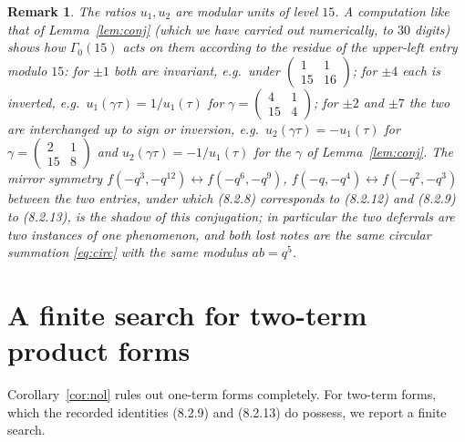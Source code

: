 \documentclass[pdflatex,sn-mathphys-num]{sn-jnl}
\theoremstyle{thmstyleone}%
\theoremstyle{thmstyletwo}%
\newtheorem{remark}{Remark}%
\newcommand{\f}{f}
\begin{document}
\begin{remark}
The ratios $u_1,u_2$ are modular units of level $15$. A computation like that of Lemma~\ref{lem:conj} (which we have carried out numerically, to $30$ digits) shows how $\Gamma_0(15)$ acts on them according to the residue of the upper-left entry modulo $15$: for $\pm1$ both are invariant, e.g.\ under $\left(\begin{smallmatrix}1&1\\15&16\end{smallmatrix}\right)$; for $\pm4$ each is inverted, e.g.\ $u_1(\gamma\tau)=1/u_1(\tau)$ for $\gamma=\left(\begin{smallmatrix}4&1\\15&4\end{smallmatrix}\right)$; for $\pm2$ and $\pm7$ the two are interchanged up to sign or inversion, e.g.\ $u_2(\gamma\tau)=-u_1(\tau)$ for $\gamma=\left(\begin{smallmatrix}2&1\\15&8\end{smallmatrix}\right)$ and $u_2(\gamma\tau)=-1/u_1(\tau)$ for the $\gamma$ of Lemma~\ref{lem:conj}. The mirror symmetry
$\f(-q^3,-q^{12})\leftrightarrow\f(-q^6,-q^9)$, $\f(-q,-q^4)\leftrightarrow\f(-q^2,-q^3)$ between the two entries, under which (8.2.8) corresponds to (8.2.12) and (8.2.9) to (8.2.13), is the shadow of this conjugation; in particular the two deferrals are two instances of one phenomenon, and both lost notes are the same circular summation \eqref{eq:circ} with the same modulus $ab=q^5$.
\end{remark}

\section{A finite search for two-term product forms}\label{sec:yoqlik}

Corollary~\ref{cor:nol} rules out one-term forms completely. For two-term forms, which the recorded identities (8.2.9) and (8.2.13) do possess, we report a finite search.
\end{document}
